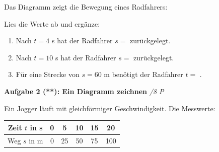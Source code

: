 \documentclass[11pt,a4paper]{article}
\newcommand{\luecke}[1]{\underline{\hspace{#1}}}
\newcommand{\stern}[1]{\textbf{(#1)}}
\begin{document}
\vspace{0.5em}
\noindent Das Diagramm zeigt die Bewegung eines Radfahrers:

\begin{center}
\end{center}

\noindent Lies die Werte ab und ergänze:

\begin{enumerate}[label=\alph*), leftmargin=2em]
    \item Nach $t = 4$ s hat der Radfahrer $s =$ \luecke{2cm} zurückgelegt.
    \item Nach $t = 10$ s hat der Radfahrer $s =$ \luecke{2cm} zurückgelegt.
    \item Für eine Strecke von $s = 60$ m benötigt der Radfahrer $t =$ \luecke{2cm}.
\end{enumerate}

\vspace{1.5em}

\noindent\textbf{Aufgabe 2 \stern{**}: Ein Diagramm zeichnen} \hfill \textit{/8 P}

\vspace{0.5em}
\noindent Ein Jogger läuft mit gleichförmiger Geschwindigkeit. Die Messwerte:

\begin{center}
\begin{tabular}{|c|c|c|c|c|c|}
\hline
Zeit $t$ in s & 0 & 5 & 10 & 15 & 20 \\
\hline
Weg $s$ in m & 0 & 25 & 50 & 75 & 100 \\
\hline
\end{tabular}
\end{center}
\end{document}
